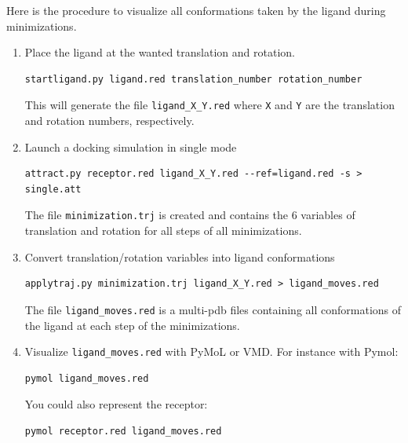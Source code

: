 \documentclass[12pt,a4paper]{article}
\begin{document}
Here is the procedure to visualize all conformations taken by the ligand during minimizations.

\begin{enumerate}
\item Place the ligand at the wanted translation and rotation.
\begin{verbatim}
startligand.py ligand.red translation_number rotation_number
\end{verbatim}
This will generate the file \verb=ligand_X_Y.red= where \verb=X= and \verb=Y= are the translation and rotation numbers, respectively.
\item Launch a docking simulation in single mode
\begin{verbatim}
attract.py receptor.red ligand_X_Y.red --ref=ligand.red -s > single.att
\end{verbatim}
The file \verb=minimization.trj= is created and contains the 6 variables of translation and rotation for all steps of all minimizations.
\item Convert translation/rotation variables into ligand conformations
\begin{verbatim}
applytraj.py minimization.trj ligand_X_Y.red > ligand_moves.red
\end{verbatim}
The file \verb=ligand_moves.red= is a multi-pdb files containing all conformations of the ligand at each step of the minimizations.
\item Visualize \verb=ligand_moves.red= with PyMoL or VMD. For instance with Pymol:
\begin{verbatim}
pymol ligand_moves.red
\end{verbatim}
You could also represent the receptor:
\begin{verbatim}
pymol receptor.red ligand_moves.red
\end{verbatim}
\end{enumerate}

 

{}

\end{document}
